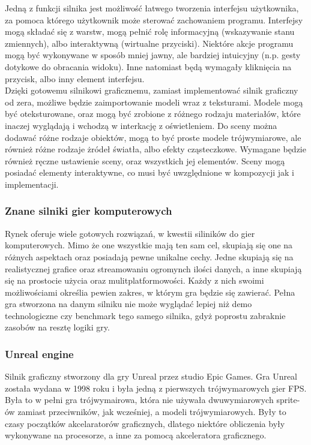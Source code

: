 \documentclass{article} %
\begin{document}
        Jedną z funkcji silnika jest możliwość łatwego tworzenia interfejsu użytkownika, za pomoca którego użytkownik może sterować zachowaniem programu. Interfejsy mogą składać się z warstw, mogą pełnić rolę informacyjną (wskazywanie stanu zmiennych), albo interaktywną (wirtualne przyciski). Niektóre akcje programu mogą być wykonywane w sposób mniej jawny, ale bardziej intuicyjny (n.p. gesty dotykowe do obracania widoku). Inne natomiast będą wymagały kliknięcia na przycisk, albo inny element interfejsu.
        \\
        
        Dzięki gotowemu silnikowi graficznemu, zamiast implementować silnik graficzny od zera, możliwe będzie zaimportowanie modeli wraz z teksturami. Modele mogą być oteksturowane, oraz mogą być zrobione z różnego rodzaju materiałów, które inaczej wyglądają i wchodzą w interkację z oświetleniem. Do sceny można dodawać różne rodzaje obiektów, mogą to być proste modele trójwymiarowe, ale również różne rodzaje żródeł światła, albo efekty cząsteczkowe. Wymagane będzie również ręczne ustawienie sceny, oraz wszystkich jej elementów. Sceny mogą posiadać elementy interaktywne, co musi być uwzględnione w kompozycji jak i implementacji.
        \\
                      
        \subsubsection{Znane silniki gier komputerowych}
        Rynek oferuje wiele gotowych rozwiązań, w kwestii siliników do gier komputerowych. Mimo że one wszystkie mają ten sam cel, skupiają się one na różnych aspektach oraz posiadają pewne unikalne cechy. Jedne skupiają się na realistycznej grafice oraz streamowaniu ogromynch ilości danych, a inne skupiają się na prostocie użycia oraz mulitplatformowości. Każdy z nich swoimi możliwościami określia pewien zakres, w którym gra będzie się zawierać. Pełna gra stworzona na danym silniku nie może wyglądać lepiej niż demo technologiczne czy benchmark tego samego silnika, gdyż poprostu zabraknie zasobów na resztę logiki gry.
        \\
        
        \subsubsection*{Unreal engine}
        Silnik graficzny stworzony dla gry Unreal przez studio Epic Games. Gra Unreal została wydana w 1998 roku i była jedną z pierwszych trójwymarowych gier FPS. Była to w pełni gra trójwymairowa, która nie używała dwuwymiarowych sprite-ów zamiast przeciwników, jak wcześniej, a modeli trójwymiarowych. Były to czasy początków akcelaratorów graficznych, dlatego niektóre obliczenia były wykonywane na procesorze, a inne za pomocą akceleratora graficznego.
        \\
        
\end{document}
